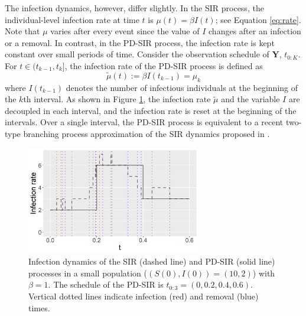 \documentclass[12pt]{article}
\begin{document}
	The infection dynamics, however, differ slightly.
	In the SIR process, the individual-level infection rate at time $t$ is $\mu(t) = \beta I(t)$; see Equation \eqref{eq:rate}.
	Note that $\mu$ varies after every event since the value of $I$ changes after an infection or a removal.
	In contrast, in the PD-SIR process, the infection rate is kept constant over small periods of time. Consider the observation schedule of $\mathbf{Y}$, $t_{0:K}$. For $t \in (t_{k-1}, t_k]$, the infection rate of the PD-SIR process is defined as
	$$\tilde{\mu}(t) := \beta I(t_{k - 1}) = \mu_k$$
	where $I(t_{k-1})$ denotes the number of infectious individuals at the beginning of the $k$th interval. As shown in Figure \ref{fig:mu}, the infection rate $\tilde{\mu}$ and the variable $I$ are decoupled in each interval, and the infection rate is reset at the beginning %
	of the intervals. Over a single interval, the PD-SIR process is equivalent to a recent two-type branching process approximation of the SIR dynamics proposed in \cite{Ho.2018b}. 
	
	\begin{figure}
		\begin{center}
			\includegraphics[width=3in]{infection_rate_SIR_PDSIR}
		\end{center}
		\caption{Infection dynamics of the SIR (dashed line) and PD-SIR (solid line) processes in a small population ($(S(0), I(0)) = (10,2)$) with $\beta=1$. The schedule of the PD-SIR is $t_{0:3}=(0, 0.2, 0.4, 0.6)$.
			Vertical dotted lines indicate infection (red) and removal (blue) times. \label{fig:mu}}
	\end{figure}
	
\end{document}
